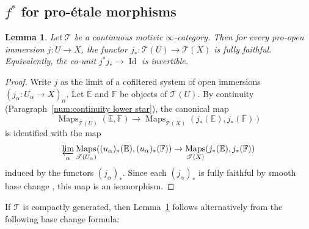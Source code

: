 \documentclass[11pt]{article}
\newcommand{\Subsection}{\subsection}
\numberwithin{equation}{section}\renewcommand{\encodingdefault}{TU}
\newcommand{\T}{\mathscr T}
\newcommand{\E}{\mathbb E}
\newcommand{\F}{\mathbb F}
\DeclareMathOperator{\Id}{Id}
\DeclareMathOperator{\Maps}{Maps}
\DeclareMathOperator{\plim}{\varprojlim}
\newtheorem{lm}[thm]{Lemma}
\theoremstyle{remark}
\theoremstyle{definition}
\numberwithin{equation}{thm}
\begin{document}
\Subsection{\texorpdfstring{$f^*$}{f\textasciicircum*} for pro-étale morphisms}

\begin{lm}\label{lm:pro-open immersion}
Let $\T$ be a continuous motivic $\infty$-category.
Then for every pro-open immersion $j : U \to X$, the functor $j_* : \T(U) \to \T(X)$ is fully faithful.
Equivalently, the co-unit $j^*j_* \to \Id$ is invertible.
\end{lm}
\begin{proof}
Write $j$ as the limit of a cofiltered system of open immersions \hbox{$(j_\alpha\!:\!U_\alpha\!\to\!X)_\alpha$}.
Let $\E$ and $\F$ be objects of $\T(U)$.
By continuity (Paragraph~\ref{num:continuity lower star}), the canonical map
\[
\Maps_{\T(U)}(\E, \F)
\to \Maps_{\T(X)}(j_*(\E), j_*(\F))
\]
is identified with the map
\[
\plim_\alpha \Maps_{\T(U_\alpha)}((u_\alpha)_*(\E), (u_\alpha)_*(\F))
\to \Maps_{\T(X)}(j_*(\E), j_*(\F))
\]
induced by the functors $(j_\alpha)_*$.
Since each $(j_\alpha)_*$ is fully faithful by smooth base change \cite[1.1.20]{CD3}, this map is an isomorphism.
\end{proof}

If $\T$ is compactly generated, then Lemma~\ref{lm:pro-open immersion} follows alternatively from the following base change formula:
\end{document}
